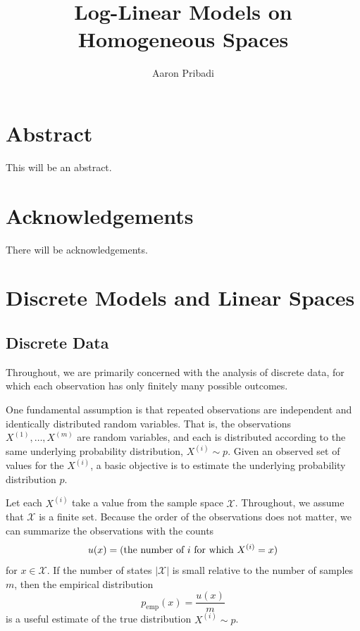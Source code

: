 \documentclass[cclicense]{hmcthesis}
\title{Log-Linear Models on Homogeneous Spaces}
\author{Aaron Pribadi}
\newcommand*{\x}[1]{\ensuremath{X^{(#1)}}}
\providecommand*{\xs}{\mathcal X}
\newcommand*{\emp}{\mathrm{emp}}
\numberwithin{equation}{chapter}
\numberwithin{thmcounter}{chapter}
\begin{document}
\frontmatter

\maketitle

\tableofcontents




\chapter{Abstract}
    This will be an abstract.

\chapter{Acknowledgements}
    There will be acknowledgements.

\mainmatter

\chapter{Discrete Models and Linear Spaces}

    \section{Discrete Data}

    Throughout, we are primarily concerned with the analysis of discrete data,
    for which each observation has only finitely many possible outcomes.

    One fundamental assumption is that repeated observations are independent and
    identically distributed random variables.  That is, the observations $\x 1,
    \ldots, \x m$ are random variables, and each is distributed according to the
    same underlying probability distribution, $\x i \sim p$.  Given an observed
    set of values for the $\x i$, a basic objective is to estimate the
    underlying probability distribution $p$.

    Let each $\x i$ take a value from the sample space $\xs$.  Throughout, we
    assume that $\xs$ is a finite set.  Because the order of the observations
    does not matter, we can summarize the observations with the counts
    \begin{equation*}
        u(x) = \pdel{\text{the number of $i$ for which $\x i = x$}}
    \end{equation*}
    for $x \in \xs$.  If the number of states $|\xs|$ is small relative to the
    number of samples $m$, then the empirical distribution
    \begin{equation}
        p_\emp(x) = \frac{u(x)}{m}
        \label{eq:empirical}
    \end{equation}
    is a useful estimate of the true distribution $\x i \sim p$.
\end{document}
